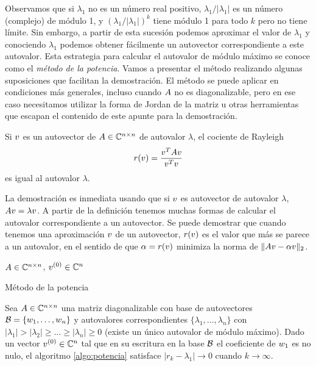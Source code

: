 Observamos que si $\lambda_1$ no es un número real positivo, $\lambda_1/|\lambda_1|$ es un número (complejo) de módulo 1, y $(\lambda_1 / |\lambda_1|)^k$ tiene módulo 1 para todo $k$ pero no tiene límite. Sin embargo, a partir de esta sucesión podemos aproximar el valor de $\lambda_1$ y conociendo $\lambda_1$ podemos obtener fácilmente un autovector correspondiente a este autovalor. Esta estrategia para calcular el autovalor de módulo máximo se conoce como el \emph{método de la potencia}. Vamos a presentar el método realizando algunas suposiciones que facilitan la demostración. El método se puede aplicar en condiciones más generales, incluso cuando $\Ab$ no es diagonalizable, pero en ese caso necesitamos utilizar la forma de Jordan de la matriz u otras herramientas que escapan el contenido de este apunte para la demostración.


\begin{lema}
Si $\vb$ es un autovector de $\Ab \in \Cnn$ de autovalor $\lambda$, el cociente de Rayleigh
$$
r(\vb) = \frac{\vb^T \Ab \vb}{\vb^T \vb}
$$
es igual al autovalor $\lambda$.
\end{lema}

La demostración es inmediata usando que si $\vb$ es autovector de autovalor $\lambda$, $\Ab \vb = \lambda \vb$.
A partir de la definición tenemos muchas formas de calcular el autovalor correspondiente a un autovector. Se puede demostrar que cuando tenemos una aproximación $\vb$ de un autovector, $r(\vb)$ es el valor que más se parece a un autovalor, en el sentido de que $\alpha = r(\vb)$ minimiza la norma de $\|\Ab\vb - \alpha \vb\|_2$.

\begin{algorithm}[H]
\SetAlgoLined
$\Ab \in \C^{n \times n}$, $\vb^{(0)} \in \C^n$\;
 \caption{Método de la potencia}
 \label{algo:potencia}
\end{algorithm}


\begin{teo}
Sea $\Ab \in \Cnn$ una matriz diagonalizable con base de autovectores $\B = \{\wb_1, \dots, \wb_n\}$ y autovalores correspondientes $\{\lambda_1, \dots, \lambda_n\}$ con $|\lambda_1| > |\lambda_2| \ge \dots \ge |\lambda_n| \ge 0$ (existe un único autovalor de módulo máximo). Dado un vector $\vb^{(0)} \in \C^n$ tal que en su escritura en la base $\mathcal B$ el coeficiente de $\wb_1$ es no nulo, el algoritmo \ref{algo:potencia} satisface $|r_k - \lambda_1| \rightarrow 0$ cuando $k \rightarrow \infty$.
\end{teo}

